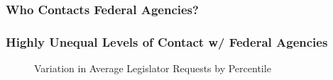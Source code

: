 \documentclass[xcolor=dvipsnames]{beamer}
\begin{document}
\begin{frame}
\frametitle{Who Contacts Federal Agencies?}







\end{frame}

\begin{frame}
\frametitle{Highly Unequal Levels of Contact w/ Federal Agencies}
\begin{figure}
\centering

\caption{Variation in Average Legislator Requests by Percentile} \label{f:contact1} 
\end{figure}

\end{frame}
\end{document}
